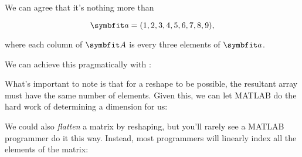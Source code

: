 \documentclass{article}
\begin{document}
We can agree that it's nothing more than

\begin{equation}
	\mat{a}
	=
	(1, 2, 3, 4, 5, 6, 7, 8, 9),
\end{equation}

where each column of \(\mat{A}\) is every three elements of \(\mat{a}\).

\begin{minipage}{\textwidth}
	We can achieve this pragmatically with :

	\vspace{1em}

\end{minipage}

What's important to note is that for a reshape to be possible, the
resultant array must have the same number of elements.  Given this, we
can let MATLAB do the hard work of determining a dimension for us:


We could also \emph{flatten} a matrix by reshaping, but you'll rarely
see a MATLAB programmer do it this way.  Instead, most programmers will
linearly index all the elements of the matrix:

\end{document}
